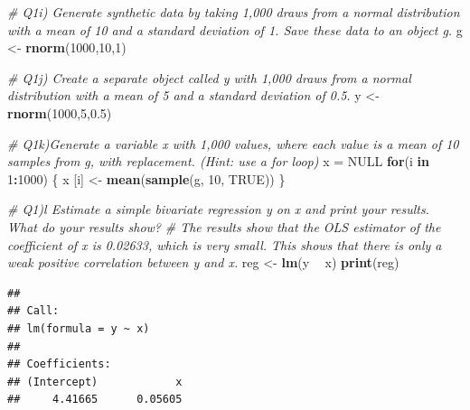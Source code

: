 \documentclass[]{article}
\newenvironment{Shaded}{\begin{snugshade}}{\end{snugshade}}
\newcommand{\KeywordTok}[1]{\textcolor[rgb]{0.13,0.29,0.53}{\textbf{#1}}}
\newcommand{\DecValTok}[1]{\textcolor[rgb]{0.00,0.00,0.81}{#1}}
\newcommand{\FloatTok}[1]{\textcolor[rgb]{0.00,0.00,0.81}{#1}}
\newcommand{\StringTok}[1]{\textcolor[rgb]{0.31,0.60,0.02}{#1}}
\newcommand{\CommentTok}[1]{\textcolor[rgb]{0.56,0.35,0.01}{\textit{#1}}}
\newcommand{\OtherTok}[1]{\textcolor[rgb]{0.56,0.35,0.01}{#1}}
\newcommand{\ControlFlowTok}[1]{\textcolor[rgb]{0.13,0.29,0.53}{\textbf{#1}}}
\newcommand{\OperatorTok}[1]{\textcolor[rgb]{0.81,0.36,0.00}{\textbf{#1}}}
\newcommand{\NormalTok}[1]{#1}
\begin{document}
\begin{Shaded}
\begin{Highlighting}[]
\CommentTok{# Q1i) Generate synthetic data by taking 1,000 draws from a normal distribution with a mean of 10 and a standard deviation of 1. Save these data to an object g.}
\NormalTok{g <-}\StringTok{ }\KeywordTok{rnorm}\NormalTok{(}\DecValTok{1000}\NormalTok{,}\DecValTok{10}\NormalTok{,}\DecValTok{1}\NormalTok{)}

\CommentTok{# Q1j) Create a separate object called y with 1,000 draws from a normal distribution with a mean of 5 and a standard deviation of 0.5. }
\NormalTok{y <-}\StringTok{ }\KeywordTok{rnorm}\NormalTok{(}\DecValTok{1000}\NormalTok{,}\DecValTok{5}\NormalTok{,}\FloatTok{0.5}\NormalTok{)}

\CommentTok{# Q1k)Generate a variable x with 1,000 values, where each value is a mean of 10 samples from g, with replacement. (Hint: use a for loop)}
\NormalTok{x =}\StringTok{ }\OtherTok{NULL}
\ControlFlowTok{for}\NormalTok{(i }\ControlFlowTok{in} \DecValTok{1}\OperatorTok{:}\DecValTok{1000}\NormalTok{) \{}
\NormalTok{  x [i] <-}\StringTok{ }\KeywordTok{mean}\NormalTok{(}\KeywordTok{sample}\NormalTok{(g, }\DecValTok{10}\NormalTok{, }\OtherTok{TRUE}\NormalTok{))}
\NormalTok{\}}

\CommentTok{# Q1)l Estimate a simple bivariate regression y on x and print your results. What do your results show?}
\CommentTok{# The results show that the OLS estimator of the coefficient of x is 0.02633, which is very small. This shows that there is only a weak positive correlation between y and x.}
\NormalTok{reg <-}\StringTok{ }\KeywordTok{lm}\NormalTok{(y }\OperatorTok{~}\StringTok{ }\NormalTok{x)}
\KeywordTok{print}\NormalTok{(reg)}
\end{Highlighting}
\end{Shaded}

\begin{verbatim}
## 
## Call:
## lm(formula = y ~ x)
## 
## Coefficients:
## (Intercept)            x  
##     4.41665      0.05605
\end{verbatim}
\end{document}
